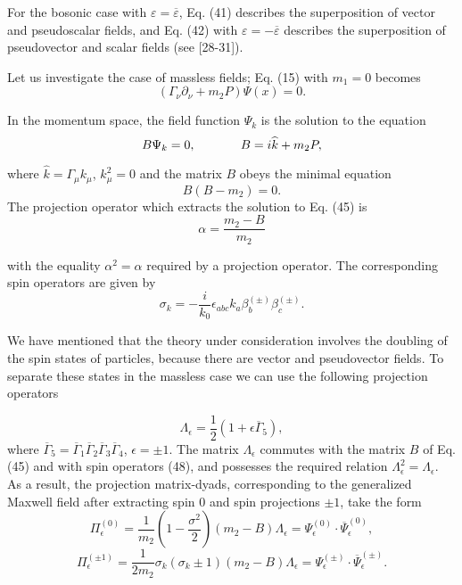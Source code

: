 \documentclass[a4paper,12pt]{article}
\begin{document}
For the bosonic case with $\varepsilon =\overline{\varepsilon }$, Eq. (41)
describes the superposition of vector and pseudoscalar fields, and Eq. (42)
with $\varepsilon =-\overline{\varepsilon }$ describes the superposition of
pseudovector and scalar fields (see [28-31]).

Let us investigate the case of massless fields; Eq. (15) with $m_1=0$
becomes
\begin{equation}
\left( \Gamma _\nu \partial _\nu +m_2P\right) \Psi (x)=0
.\label{44}
\end{equation}

In the momentum space, the field function $\Psi _k$ is the solution to the
equation
\begin{equation}
B\Psi _k=0 ,\hspace{0.5in}B=i\widehat{k}+m_2P , \label{45}
\end{equation}

where $\widehat{k}=\Gamma _\mu k_\mu $, $k_\mu ^2=0$ and the matrix $B$
obeys the minimal equation
\begin{equation}
B\left( B-m_2\right) =0 . \label{46}
\end{equation}
The projection operator which extracts the solution to Eq. (45) is
\begin{equation}
\alpha =\frac{m_2-B}{m_2}  \label{47}
\end{equation}

with the equality $\alpha ^2=\alpha $ required by a projection operator. The
corresponding spin operators are given by
\begin{equation}
\sigma _k=-\frac i{k_0}\epsilon _{abc}k_a\beta _b^{(\pm )}\beta
_c^{(\pm )} .\label{48}
\end{equation}

We have mentioned that the theory under consideration involves the
doubling of the spin states of particles, because there are vector
and pseudovector fields. To separate these states in the massless
case we can use the following projection operators

\[
\Lambda _\epsilon =\frac 12\left( 1+\epsilon \overline{\Gamma
}_5\right) ,
\]
where $\overline{\Gamma }_5=\overline{\Gamma }_1\overline{\Gamma
}_2 \overline{\Gamma }_3\overline{\Gamma }_4$, $\epsilon =\pm 1$.
The matrix $ \Lambda _\epsilon $ commutes with the matrix $B$ of
Eq. (45) and with spin operators (48), and possesses the required
relation $\Lambda _\epsilon ^2=\Lambda _\epsilon $. As a result,
the projection matrix-dyads, corresponding to the generalized
Maxwell field after extracting spin $0$ and spin projections $\pm
1$, take the form
\[
\Pi^{(0)}_\epsilon =\frac 1{m_2}\left( 1-\frac{\sigma ^2}2\right)
\left( m_2-B\right) \Lambda _\epsilon =\Psi ^{(0)}_\epsilon \cdot
\overline{\Psi }^{(0)}_\epsilon ,
\]
\vspace{-8mm}
\begin{equation}
\label{49}
\end{equation}
\vspace{-8mm}
\[
\Pi^{(\pm 1)}_\epsilon=\frac 1{2m_2}\sigma _k\left( \sigma _k\pm
1\right) \left( m_2-B\right)\Lambda _\epsilon  =\Psi ^{(\pm
)}_\epsilon \cdot \overline{\Psi }^{(\pm )}_\epsilon .
\]
\end{document}
